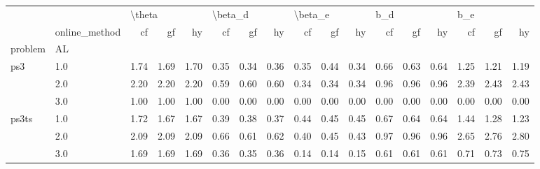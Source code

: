 \begin{tabular}{llrrrrrrrrrrrrrrr}
\toprule
      & {} & \multicolumn{3}{l}{\textbackslash theta} & \multicolumn{3}{l}{\textbackslash beta\_d} & \multicolumn{3}{l}{\textbackslash beta\_e} & \multicolumn{3}{l}{b\_d} & \multicolumn{3}{l}{b\_e} \\
      & online\_method &     cf &   gf &   hy &      cf &   gf &   hy &      cf &   gf &   hy &   cf &   gf &   hy &   cf &   gf &   hy \\
problem & AL &        &      &      &         &      &      &         &      &      &      &      &      &      &      &      \\
\midrule
ps3 & 1.0 &   1.74 & 1.69 & 1.70 &    0.35 & 0.34 & 0.36 &    0.35 & 0.44 & 0.34 & 0.66 & 0.63 & 0.64 & 1.25 & 1.21 & 1.19 \\
      & 2.0 &   2.20 & 2.20 & 2.20 &    0.59 & 0.60 & 0.60 &    0.34 & 0.34 & 0.34 & 0.96 & 0.96 & 0.96 & 2.39 & 2.43 & 2.43 \\
      & 3.0 &   1.00 & 1.00 & 1.00 &    0.00 & 0.00 & 0.00 &    0.00 & 0.00 & 0.00 & 0.00 & 0.00 & 0.00 & 0.00 & 0.00 & 0.00 \\
ps3ts & 1.0 &   1.72 & 1.67 & 1.67 &    0.39 & 0.38 & 0.37 &    0.44 & 0.45 & 0.45 & 0.67 & 0.64 & 0.64 & 1.44 & 1.28 & 1.23 \\
      & 2.0 &   2.09 & 2.09 & 2.09 &    0.66 & 0.61 & 0.62 &    0.40 & 0.45 & 0.43 & 0.97 & 0.96 & 0.96 & 2.65 & 2.76 & 2.80 \\
      & 3.0 &   1.69 & 1.69 & 1.69 &    0.36 & 0.35 & 0.36 &    0.14 & 0.14 & 0.15 & 0.61 & 0.61 & 0.61 & 0.71 & 0.73 & 0.75 \\
\bottomrule
\end{tabular}
